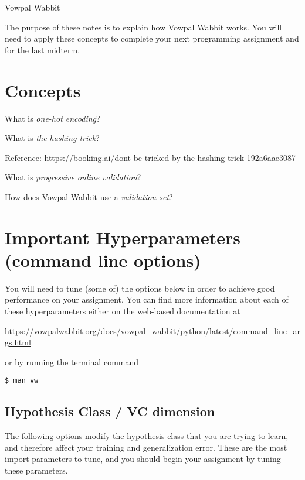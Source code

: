 \documentclass[10pt]{exam}
\theoremstyle{definition}
\begin{document}
\begin{center}
{
\Huge
Vowpal Wabbit
}
\end{center}


The purpose of these notes is to explain how Vowpal Wabbit works.
You will need to apply these concepts to complete your next programming assignment and for the last midterm.

\section{Concepts}
What is \emph{one-hot encoding}?

\vspace{4in}
\noindent
What is \emph{the hashing trick}?

Reference: \url{https://booking.ai/dont-be-tricked-by-the-hashing-trick-192a6aae3087}

\newpage
\noindent
What is \emph{progressive online validation}?

\vspace{4in}
\noindent
How does Vowpal Wabbit use a \emph{validation set}?

\newpage
\section{Important Hyperparameters (command line options)}

You will need to tune (some of) the options below in order to achieve good performance on your assignment.
You can find more information about each of these hyperparameters either on the web-based documentation at

    \vspace{0.1in}
    \url{https://vowpalwabbit.org/docs/vowpal_wabbit/python/latest/command_line_args.html}

    \vspace{0.1in}
\noindent
or by running the terminal command

    \vspace{0.1in}
    \lstinline{$ man vw}

\subsection{Hypothesis Class / VC dimension}

The following options modify the hypothesis class that you are trying to learn,
and therefore affect your training and generalization error.
These are the most import parameters to tune, and you should begin your assignment by tuning these parameters.
\end{document}
